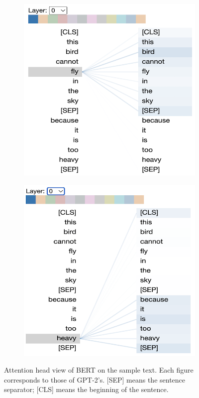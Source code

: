 \documentclass[]{article}
\begin{document}
\begin{figure}[!h]
\begin{subfigure}[b]{0.48\textwidth}
    \end{subfigure}
    \vfill
    \begin{subfigure}[b]{0.48\textwidth}
        \includegraphics[width=\textwidth]{FIGS/bert_head_l0_fly.png}
    \end{subfigure}
    \hfill
    \begin{subfigure}[b]{0.48\textwidth}
        \includegraphics[width=\textwidth]{FIGS/bert_head_l0_heavy.png}
    \end{subfigure} 
    \caption{Attention head view of BERT on the sample text. Each figure corresponds to those of GPT-2's. [SEP] means the sentence separator; [CLS] means the beginning of the sentence.}
    \label{fig:head_view_bert}
\end{figure}
\end{document}
